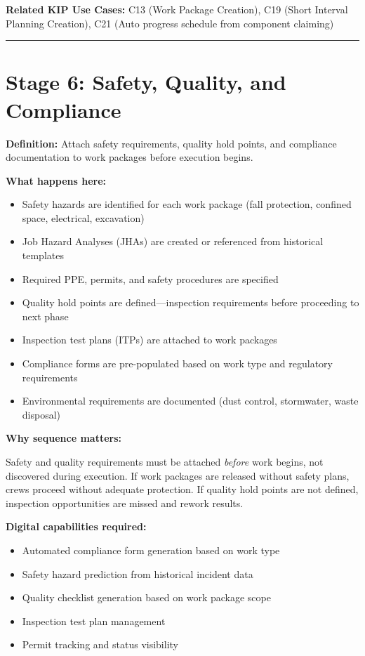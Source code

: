 \documentclass[11pt, letterpaper]{article}
\begin{document}
\textbf{Related KIP Use Cases:} C13 (Work Package Creation), C19 (Short Interval Planning Creation), C21 (Auto progress schedule from component claiming)

\vspace{1em}

\hrule

\vspace{1em}

\section*{Stage 6: Safety, Quality, and Compliance}

\textbf{Definition:} Attach safety requirements, quality hold points, and compliance documentation to work packages before execution begins.

\textbf{What happens here:}
\begin{itemize}
    \item Safety hazards are identified for each work package (fall protection, confined space, electrical, excavation)
    \item Job Hazard Analyses (JHAs) are created or referenced from historical templates
    \item Required PPE, permits, and safety procedures are specified
    \item Quality hold points are defined---inspection requirements before proceeding to next phase
    \item Inspection test plans (ITPs) are attached to work packages
    \item Compliance forms are pre-populated based on work type and regulatory requirements
    \item Environmental requirements are documented (dust control, stormwater, waste disposal)
\end{itemize}

\textbf{Why sequence matters:}

Safety and quality requirements must be attached \textit{before} work begins, not discovered during execution. If work packages are released without safety plans, crews proceed without adequate protection. If quality hold points are not defined, inspection opportunities are missed and rework results.

\textbf{Digital capabilities required:}
\begin{itemize}
    \item Automated compliance form generation based on work type
    \item Safety hazard prediction from historical incident data
    \item Quality checklist generation based on work package scope
    \item Inspection test plan management
    \item Permit tracking and status visibility
\end{itemize}
\end{document}
